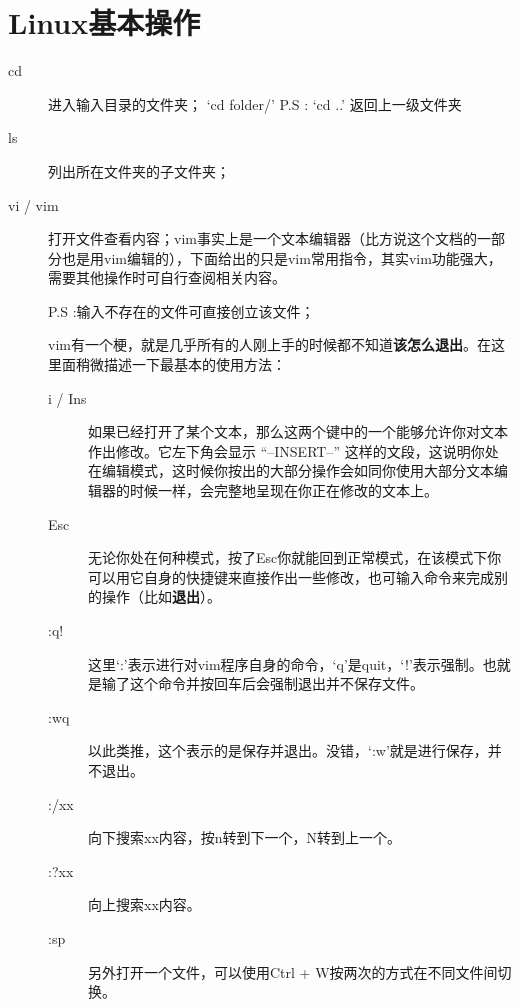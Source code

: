 \documentclass[12pt,a4paper,openany,twoside]{book}
\numberwithin{equation}{section}
\begin{document}
    \section{Linux基本操作}
    \begin{description}
    \item[cd]
      进入输入目录的文件夹；
      `cd folder/'
      P.S : `cd ..' 返回上一级文件夹
    \item[ls]
      列出所在文件夹的子文件夹；

    \item[vi / vim]
      打开文件查看内容；vim事实上是一个文本编辑器（比方说这个文档的一部分也是用vim编辑的），下面给出的只是vim常用指令，其实vim功能强大，需要其他操作时可自行查阅相关内容。

      P.S :输入不存在的文件可直接创立该文件；

    vim有一个梗，就是几乎所有的人刚上手的时候都不知道\textbf{该怎么退出}。在这里面稍微描述一下最基本的使用方法：
    \begin{description}
      \item[i / Ins] 如果已经打开了某个文本，那么这两个键中的一个能够允许你对文本作出修改。它左下角会显示 ``--INSERT--'' 这样的文段，这说明你处在编辑模式，这时候你按出的大部分操作会如同你使用大部分文本编辑器的时候一样，会完整地呈现在你正在修改的文本上。
  
      \item[Esc] 无论你处在何种模式，按了Esc你就能回到正常模式，在该模式下你可以用它自身的快捷键来直接作出一些修改，也可输入命令来完成别的操作（比如\textbf{退出}）。

      \item[:q!] 这里`:'表示进行对vim程序自身的命令，`q'是quit，`!'表示强制。也就是输了这个命令并按回车后会强制退出并不保存文件。

      \item[:wq] 以此类推，这个表示的是保存并退出。没错，`:w'就是进行保存，并不退出。
      
      \item[:/xx] 向下搜索xx内容，按n转到下一个，N转到上一个。
      
      \item[:?xx] 向上搜索xx内容。  
      
      \item[:sp] 另外打开一个文件，可以使用Ctrl + W按两次的方式在不同文件间切换。  
      

\end{description}
\end{description}
\end{document}
